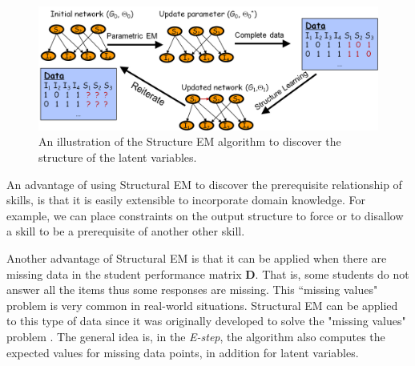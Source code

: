 \documentclass{edm_template}
\begin{document}
\begin{figure}%
	\begin{center}
		\includegraphics[width=1.0\linewidth]{figures/sem.png}
	\end{center}
	\caption{\small An illustration of the Structure EM algorithm to discover the structure of the latent variables.}
	\label{fig:sem} 
\end{figure} 

An advantage of using Structural EM to discover the prerequisite relationship of skills, is that it is easily extensible to incorporate domain knowledge.
For example, we can  place constraints on the output structure to force or to disallow a skill to be a prerequisite of another other skill.

Another advantage of Structural EM is that it can be applied when there are missing data in the student performance matrix $\mathbf{D}$. 
That is, some students do not answer all the items thus some responses are missing. This ``missing values" problem is very common in real-world situations.
Structural EM can be applied to this type of data since it was originally developed to solve the "missing values" problem \cite{friedman1997learning}.
The general idea is, in the \emph{E-step}, the algorithm also computes the expected values for missing data points, in addition for latent variables. 
\end{document}
